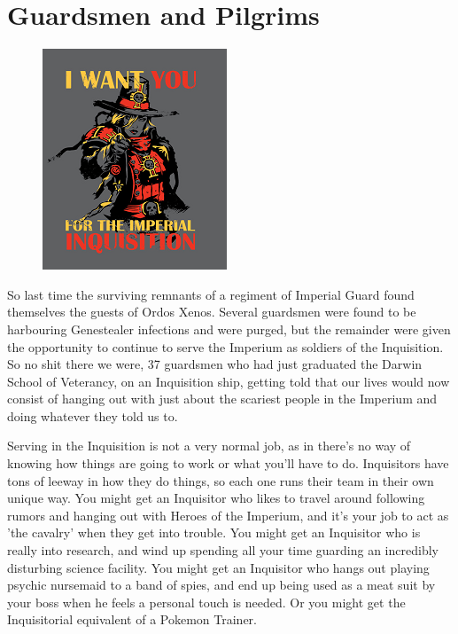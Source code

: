 \chapter{Guardsmen and Pilgrims}

\begin{figure}
	\begin{center}
		\includegraphics[width=\figwidth]{pics/2/1.png}
	\end{center}
\end{figure}
So last time the surviving remnants of a regiment of Imperial Guard found themselves the guests of Ordos Xenos. 
Several guardsmen were found to be harbouring Genestealer infections and were purged, but the remainder were given the opportunity to continue to serve the Imperium as soldiers of the Inquisition. 
So no shit there we were, 37 guardsmen who had just graduated the Darwin School of Veterancy, on an Inquisition ship, getting told that our lives would now consist of hanging out with just about the scariest people in the Imperium and doing whatever they told us to.

Serving in the Inquisition is not a very normal job, as in there's no way of knowing how things are going to work or what you'll have to do. 
Inquisitors have tons of leeway in how they do things, so each one runs their team in their own unique way. 
You might get an Inquisitor who likes to travel around following rumors and hanging out with Heroes of the Imperium, and it's your job to act as 'the cavalry' when they get into trouble. 
You might get an Inquisitor who is really into research, and wind up spending all your time guarding an incredibly disturbing science facility. 
You might get an Inquisitor who hangs out playing psychic nursemaid to a band of spies, and end up being used as a meat suit by your boss when he feels a personal touch is needed. 
Or you might get the Inquisitorial equivalent of a Pokemon Trainer.


